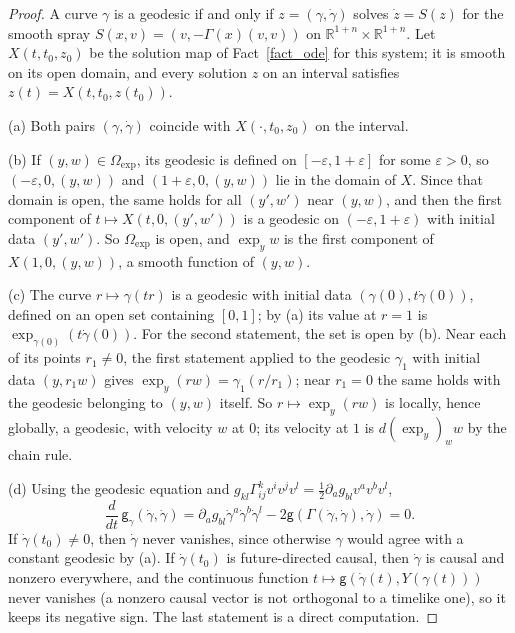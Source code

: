 \documentclass[11pt,a4paper,reqno]{amsart}
\theoremstyle{definition}
\numberwithin{equation}{section}
\newcommand{\R}{\mathbb{R}}
\newcommand{\sg}{\mathsf{g}}
\begin{document}
\begin{proof}
A curve $\gamma$ is a geodesic if and only if $z=(\gamma,\dot\gamma)$ solves $\dot z=S(z)$ for the smooth spray
$S(x,v)=(v,-\Gamma(x)(v,v))$ on $\R^{1+n}\times\R^{1+n}$. Let $X(t,t_0,z_0)$ be the solution map of Fact~\ref{fact_ode} for
this system; it is smooth on its open domain, and every solution $z$ on an interval satisfies $z(t)=X(t,t_0,z(t_0))$.

(a) Both pairs $(\gamma,\dot\gamma)$ coincide with $X(\cdot,t_0,z_0)$ on the interval.

(b) If $(y,w)\in\Omega_{\exp}$, its geodesic is defined on $[-\varepsilon,1+\varepsilon]$ for some $\varepsilon>0$, so
$(-\varepsilon,0,(y,w))$ and $(1+\varepsilon,0,(y,w))$ lie in the domain of $X$. Since that domain is open, the same holds for
all $(y',w')$ near $(y,w)$, and then the first component of $t\mapsto X(t,0,(y',w'))$ is a geodesic on
$(-\varepsilon,1+\varepsilon)$ with initial data $(y',w')$. So $\Omega_{\exp}$ is open, and $\exp_yw$ is the first component of
$X(1,0,(y,w))$, a smooth function of $(y,w)$.

(c) The curve $r\mapsto\gamma(tr)$ is a geodesic with initial data $(\gamma(0),t\dot\gamma(0))$, defined on an open set
containing $[0,1]$; by (a) its value at $r=1$ is $\exp_{\gamma(0)}(t\dot\gamma(0))$. For the second statement, the set is
open by (b). Near each of its points $r_1\ne0$, the first statement applied to the geodesic $\gamma_1$ with initial data
$(y,r_1w)$ gives $\exp_y(rw)=\gamma_1(r/r_1)$; near $r_1=0$ the same holds with the geodesic belonging to $(y,w)$ itself.
So $r\mapsto\exp_y(rw)$ is locally, hence globally, a geodesic, with velocity $w$ at $0$; its velocity at $1$ is
$d(\exp_y)_ww$ by the chain rule.

(d) Using the geodesic equation and $g_{kl}\Gamma^k_{ij}v^iv^jv^l=\frac12\partial_ag_{bl}v^av^bv^l$,
\[
\frac{d}{dt}\,\sg_{\gamma}(\dot\gamma,\dot\gamma)=\partial_ag_{bl}\dot\gamma^a\dot\gamma^b\dot\gamma^l
-2\sg(\Gamma(\dot\gamma,\dot\gamma),\dot\gamma)=0 .
\]
If $\dot\gamma(t_0)\ne0$, then $\dot\gamma$ never vanishes, since otherwise $\gamma$ would agree with a constant geodesic by
(a). If $\dot\gamma(t_0)$ is future-directed causal, then $\dot\gamma$ is causal and nonzero everywhere, and the continuous
function $t\mapsto\sg(\dot\gamma(t),Y(\gamma(t)))$ never vanishes (a nonzero causal vector is not orthogonal to a timelike one),
so it keeps its negative sign. The last statement is a direct computation.
\end{proof}
\end{document}
